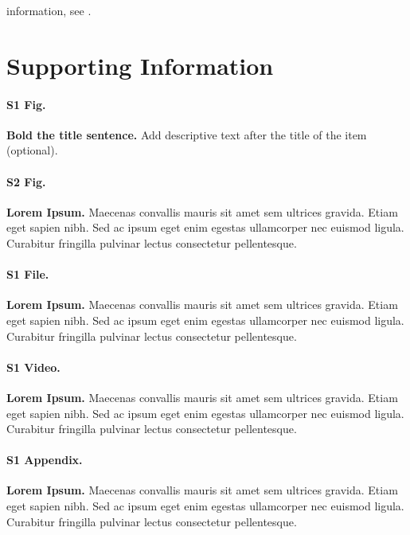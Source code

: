 \documentclass[10pt,letterpaper]{article}
\begin{document}
information, see .

\section*{Supporting Information}


\paragraph*{S1 Fig.}
\label{S1_Fig}
{\bf Bold the title sentence.} Add descriptive text after the title of the item
(optional).

\paragraph*{S2 Fig.}
\label{S2_Fig}
{\bf Lorem Ipsum.} Maecenas convallis mauris sit amet sem ultrices gravida.
Etiam eget sapien nibh. Sed ac ipsum eget enim egestas ullamcorper nec euismod
ligula. Curabitur fringilla pulvinar lectus consectetur pellentesque.

\paragraph*{S1 File.}
\label{S1_File}
{\bf Lorem Ipsum.}  Maecenas convallis mauris sit amet sem ultrices gravida.
Etiam eget sapien nibh. Sed ac ipsum eget enim egestas ullamcorper nec euismod
ligula. Curabitur fringilla pulvinar lectus consectetur pellentesque.

\paragraph*{S1 Video.}
\label{S1_Video}
{\bf Lorem Ipsum.}  Maecenas convallis mauris sit amet sem ultrices gravida.
Etiam eget sapien nibh. Sed ac ipsum eget enim egestas ullamcorper nec euismod
ligula. Curabitur fringilla pulvinar lectus consectetur pellentesque.

\paragraph*{S1 Appendix.}
\label{S1_Appendix}
{\bf Lorem Ipsum.} Maecenas convallis mauris sit amet sem ultrices gravida.
Etiam eget sapien nibh. Sed ac ipsum eget enim egestas ullamcorper nec euismod
ligula. Curabitur fringilla pulvinar lectus consectetur pellentesque.
\end{document}
